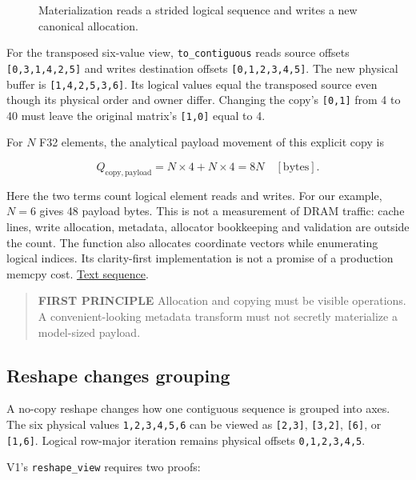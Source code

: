 \documentclass[
  10pt,
]{article}
\begin{document}
\begin{figure}[H]\centering\resizebox{\linewidth}{!}{}\caption{Materialization reads a strided logical sequence and writes a new canonical allocation.}\end{figure}

For the transposed six-value view, \texttt{to\_contiguous} reads source
offsets \texttt{{[}0,3,1,4,2,5{]}} and writes destination offsets
\texttt{{[}0,1,2,3,4,5{]}}. The new physical buffer is
\texttt{{[}1,4,2,5,3,6{]}}. Its logical values equal the transposed
source even though its physical order and owner differ. Changing the
copy's \texttt{{[}0,1{]}} from 4 to 40 must leave the original matrix's
\texttt{{[}1,0{]}} equal to 4.

For \(N\) F32 elements, the analytical payload movement of this explicit
copy is

\[
Q_{\mathrm{copy,payload}}=N\times4+N\times4=8N\quad[\mathrm{bytes}].
\]

Here the two terms count logical element reads and writes. For our
example, \(N=6\) gives 48 payload bytes. This is not a measurement of
DRAM traffic: cache lines, write allocation, metadata, allocator
bookkeeping and validation are outside the count. The function also
allocates coordinate vectors while enumerating logical indices. Its
clarity-first implementation is not a promise of a production memcpy
cost.
\href{https://github.com/hermonai/inside-the-llm-engine/blob/astra-visual-rewrite/figures/generated/tensor-copy.txt}{Text
sequence}.

\begin{quote}
\textbf{FIRST PRINCIPLE} Allocation and copying must be visible
operations. A convenient-looking metadata transform must not secretly
materialize a model-sized payload.
\end{quote}

\subsection{Reshape changes grouping}\label{reshape-changes-grouping}

A no-copy reshape changes how one contiguous sequence is grouped into
axes. The six physical values \texttt{1,2,3,4,5,6} can be viewed as
\texttt{{[}2,3{]}}, \texttt{{[}3,2{]}}, \texttt{{[}6{]}}, or
\texttt{{[}1,6{]}}. Logical row-major iteration remains physical offsets
\texttt{0,1,2,3,4,5}.

V1's \texttt{reshape\_view} requires two proofs:
\end{document}
